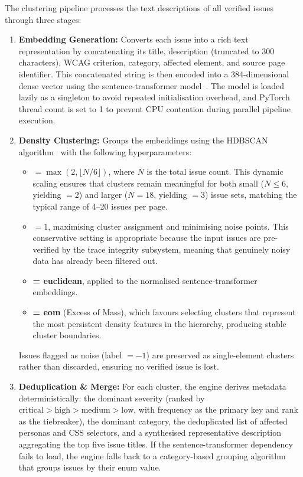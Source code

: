 The clustering pipeline processes the text descriptions of all verified issues through three stages:
\begin{enumerate}
    \item \textbf{Embedding Generation:} Converts each issue into a rich text representation by concatenating its title, description (truncated to 300 characters), WCAG criterion, category, affected element, and source page identifier. This concatenated string is then encoded into a 384-dimensional dense vector using the  sentence-transformer model~\cite{reimers2019sentencebert}. The model is loaded lazily as a singleton to avoid repeated initialisation overhead, and PyTorch thread count is set to 1 to prevent CPU contention during parallel pipeline execution.
    \item \textbf{Density Clustering:} Groups the embeddings using the HDBSCAN algorithm~\cite{mcinnes2017hdbscan} with the following hyperparameters:
    \begin{itemize}
        \item \textbf{ $= \max(2, \lfloor N/6 \rfloor)$}, where $N$ is the total issue count. This dynamic scaling ensures that clusters remain meaningful for both small ($N \leq 6$, yielding  $= 2$) and larger ($N = 18$, yielding  $= 3$) issue sets, matching the typical range of 4--20 issues per page.
        \item \textbf{ $= 1$}, maximising cluster assignment and minimising noise points. This conservative setting is appropriate because the input issues are pre-verified by the trace integrity subsystem, meaning that genuinely noisy data has already been filtered out.
        \item \textbf{ = euclidean}, applied to the normalised sentence-transformer embeddings.
        \item \textbf{ = eom} (Excess of Mass), which favours selecting clusters that represent the most persistent density features in the hierarchy, producing stable cluster boundaries.
    \end{itemize}
    Issues flagged as noise (label $= -1$) are preserved as single-element clusters rather than discarded, ensuring no verified issue is lost.
    \item \textbf{Deduplication \& Merge:} For each cluster, the engine derives metadata deterministically: the dominant severity (ranked by $\text{critical} > \text{high} > \text{medium} > \text{low}$, with frequency as the primary key and rank as the tiebreaker), the dominant category, the deduplicated list of affected personas and CSS selectors, and a synthesised representative description aggregating the top five issue titles. If the sentence-transformer dependency fails to load, the engine falls back to a category-based grouping algorithm that groups issues by their  enum value.
\end{enumerate}

